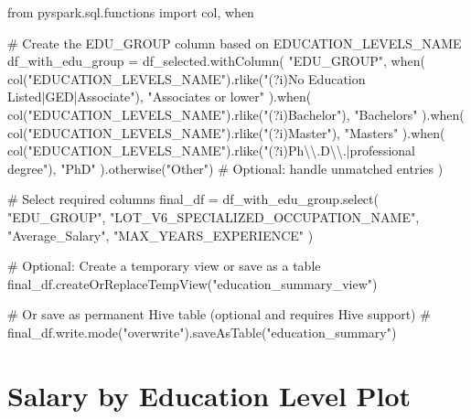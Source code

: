 \documentclass[
  letterpaper,
  DIV=11,
  numbers=noendperiod]{scrartcl}
\newenvironment{Shaded}{\begin{snugshade}}{\end{snugshade}}
\newcommand{\CharTok}[1]{\textcolor[rgb]{0.13,0.47,0.30}{#1}}
\newcommand{\CommentTok}[1]{\textcolor[rgb]{0.37,0.37,0.37}{#1}}
\newcommand{\ImportTok}[1]{\textcolor[rgb]{0.00,0.46,0.62}{#1}}
\newcommand{\NormalTok}[1]{\textcolor[rgb]{0.00,0.23,0.31}{#1}}
\newcommand{\OperatorTok}[1]{\textcolor[rgb]{0.37,0.37,0.37}{#1}}
\newcommand{\StringTok}[1]{\textcolor[rgb]{0.13,0.47,0.30}{#1}}
\begin{document}
\begin{Shaded}
\begin{Highlighting}[]
\ImportTok{from}\NormalTok{ pyspark.sql.functions }\ImportTok{import}\NormalTok{ col, when}

\CommentTok{\# Create the EDU\_GROUP column based on EDUCATION\_LEVELS\_NAME}
\NormalTok{df\_with\_edu\_group }\OperatorTok{=}\NormalTok{ df\_selected.withColumn(}
    \StringTok{"EDU\_GROUP"}\NormalTok{,}
\NormalTok{    when(}
\NormalTok{        col(}\StringTok{"EDUCATION\_LEVELS\_NAME"}\NormalTok{).rlike(}\StringTok{"(?i)No Education Listed|GED|Associate"}\NormalTok{), }
        \StringTok{"Associate\textquotesingle{}s or lower"}
\NormalTok{    ).when(}
\NormalTok{        col(}\StringTok{"EDUCATION\_LEVELS\_NAME"}\NormalTok{).rlike(}\StringTok{"(?i)Bachelor"}\NormalTok{),}
        \StringTok{"Bachelor\textquotesingle{}s"}
\NormalTok{    ).when(}
\NormalTok{        col(}\StringTok{"EDUCATION\_LEVELS\_NAME"}\NormalTok{).rlike(}\StringTok{"(?i)Master"}\NormalTok{),}
        \StringTok{"Master\textquotesingle{}s"}
\NormalTok{    ).when(}
\NormalTok{        col(}\StringTok{"EDUCATION\_LEVELS\_NAME"}\NormalTok{).rlike(}\StringTok{"(?i)Ph}\CharTok{\textbackslash{}\textbackslash{}}\StringTok{.D}\CharTok{\textbackslash{}\textbackslash{}}\StringTok{.|professional degree"}\NormalTok{),}
        \StringTok{"PhD"}
\NormalTok{    ).otherwise(}\StringTok{"Other"}\NormalTok{)  }\CommentTok{\# Optional: handle unmatched entries}
\NormalTok{)}

\CommentTok{\# Select required columns}
\NormalTok{final\_df }\OperatorTok{=}\NormalTok{ df\_with\_edu\_group.select(}
    \StringTok{"EDU\_GROUP"}\NormalTok{,}
    \StringTok{"LOT\_V6\_SPECIALIZED\_OCCUPATION\_NAME"}\NormalTok{,}
    \StringTok{"Average\_Salary"}\NormalTok{,}
    \StringTok{"MAX\_YEARS\_EXPERIENCE"}
\NormalTok{)}

\CommentTok{\# Optional: Create a temporary view or save as a table}
\NormalTok{final\_df.createOrReplaceTempView(}\StringTok{"education\_summary\_view"}\NormalTok{)}

\CommentTok{\# Or save as permanent Hive table (optional and requires Hive support)}
\CommentTok{\# final\_df.write.mode("overwrite").saveAsTable("education\_summary")}


\end{Highlighting}
\end{Shaded}

\section{Salary by Education Level
Plot}\label{salary-by-education-level-plot}
\end{document}
